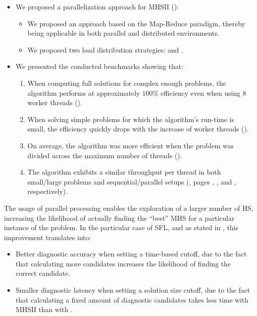 \begin{itemize}[nolistsep]
\item We proposed a parallelization approach for \ac{MHSII}
  ():
  \begin{itemize}
  \item We proposed an approach based on the Map-Reduce paradigm,
    thereby being applicable in both parallel and distributed
    environments.
  \item We proposed two load distribution strategies: \strideFn{} and
    \randomFn{}.
  \end{itemize}

\item We presented the conducted benchmarks showing that:
  \begin{enumerate}
  \item When computing full solutions for complex enough problems, the
    algorithm performs at approximately $100\%$ efficiency even when
    using $8$ worker threads
    ().
  \item When solving simple problems for which the algorithm's
    run-time is small, the efficiency quickly drops with the increase
    of worker threads ().
  \item On average, the algorithm was more efficient when the problem
    was divided across the maximum number of threads
    ().
  \item The algorithm exhibits a similar throughput per thread in both
    small/large problems and sequential/parallel setups
    (,
    pages \pageref{fig:mhs2o:results:small},
    \pageref{fig:mhs2o:results:large},
    \pageref{fig:mhs2p:results:small} and
    \pageref{fig:mhs2p:results:large}, respectively).
  \end{enumerate}
\end{itemize}

The usage of parallel processing enables the exploration of a larger
number of \ac{HS}, increasing the likelihood of actually finding the
``best'' \ac{MHS} for a particular instance of the problem.
%
In the particular case of \ac{SFL}, and as stated in
, this improvement translates into:
\begin{itemize}
\item Better diagnostic accuracy when setting a time-based cutoff,
  due to the fact that calculating more candidates increases the
  likelihood of finding the correct candidate.
\item Smaller diagnostic latency when setting a solution size cutoff,
  due to the fact that calculating a fixed amount of diagnostic
  candidates takes less time with \ac{MHSII} than with \staccato{}.
\end{itemize}
